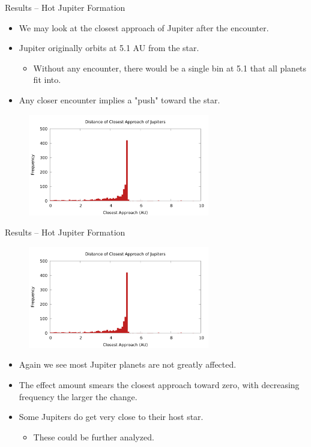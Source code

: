 \documentclass{beamer}
\begin{document}
\begin{frame}{Results -- Hot Jupiter Formation}
    \begin{itemize}
        \item We may look at the closest approach of Jupiter after the encounter.
        \item Jupiter originally orbits at 5.1 AU from the star.
            \begin{itemize}
                \item Without any encounter, there would be a single bin at 5.1 that
                    all planets fit into.
            \end{itemize}
        \item Any closer encounter implies a "push" toward the star.
    \end{itemize}
    \begin{figure}
        \centering
        \includegraphics[height=1.75in]{jupiter_distance_final}
    \end{figure}
\end{frame}

\begin{frame}{Results -- Hot Jupiter Formation}
    \begin{figure}
        \centering
        \includegraphics[height=1.75in]{jupiter_distance_final}
    \end{figure}
    \begin{itemize}
        \item Again we see most Jupiter planets are not greatly affected.
        \item The effect amount smears the closest approach toward zero,
            with decreasing frequency the larger the change.
        \item Some Jupiters do get very close to their host star.
        \begin{itemize}
            \item These could be further analyzed.
        \end{itemize}
    \end{itemize}
\end{frame}
\end{document}
